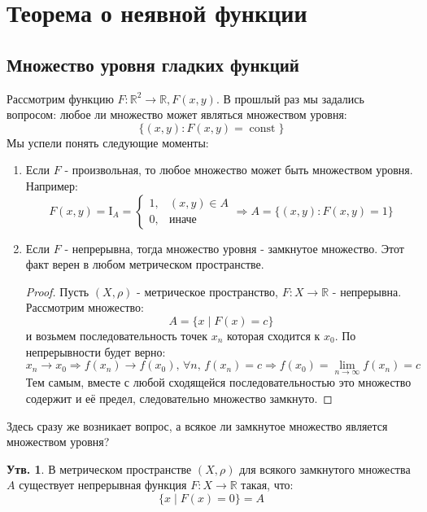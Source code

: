 \documentclass[12pt]{article}
\newcommand{\RN}[1]{%
	\textup{\uppercase\expandafter{\romannumeral#1}}%
}
\newcommand{\MR}{\mathbb{R}}
\newcommand{\MI}{\mathrm{I}}
\theoremstyle{definition}
\newtheorem{prop}{Утв.}
\DeclareMathOperator{\const}{\text{const}}
\begin{document}
\lhead{Математический анализ - \RN{2}}
\section*{Теорема о неявной функции}
\subsection*{Множество уровня гладких функций}
Рассмотрим функцию $F\colon \MR^2 \to \MR, F(x,y)$. В прошлый раз мы задались вопросом: любое ли множество может являться множеством уровня:
$$
	\{(x,y)\colon F(x,y) = \const\}
$$
Мы успели понять следующие моменты:
\begin{enumerate}[label ={\arabic*)}]
	\item Если $F$ - произвольная, то любое множество может быть множеством уровня. Например:
	$$
		F(x,y) = \MI_A =  
		\begin{cases}
			1, & (x,y) \in A \\
			0, & \text{иначе}
		\end{cases} \Rightarrow A = \{(x,y)\colon F(x,y) = 1 \}
	$$
	\item Если $F$ - непрерывна, тогда множество уровня - замкнутое множество. Этот факт верен в любом метрическом пространстве.
	\begin{proof}
		Пусть $(X,\rho)$ - метрическое пространство, $F \colon X \to \MR$ - непрерывна. Рассмотрим множество: 
		$$
			A = \{ x \mid F(x) = c \}
		$$ 
		и возьмем последовательность точек $x_n$ которая сходится к $x_0$. По непрерывности будет верно:
		$$
			x_n \to x_0 \Rightarrow f(x_n) \to f(x_0), \, \forall n, \, f(x_n) = c \Rightarrow f(x_0) = \lim\limits_{n \to \infty} f(x_n) = c
		$$
		Тем самым, вместе с любой сходящейся последовательностью это множество содержит и её предел, следовательно множество замкнуто.
	\end{proof}
\end{enumerate}
Здесь сразу же возникает вопрос, а всякое ли замкнутое множество является множеством уровня?
\begin{prop}
	В метрическом пространстве $(X, \rho)$ для всякого замкнутого множества $A$ существует непрерывная функция $F \colon X \to \MR$ такая, что:
	$$
		\{x \mid F(x) = 0 \} = A
	$$
\end{prop}
\end{document}
